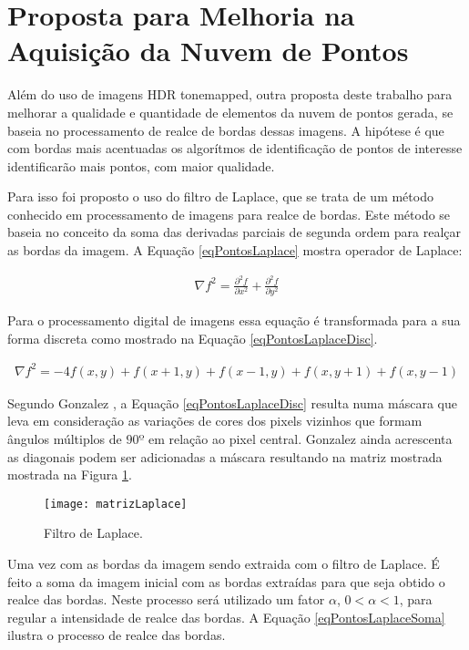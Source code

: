 \section{Proposta para Melhoria na Aquisição da Nuvem de Pontos} \label{pontosProposta}

Além do uso de imagens HDR tonemapped, outra proposta deste trabalho para melhorar a qualidade e quantidade de elementos da nuvem de pontos gerada, se baseia no processamento de realce de bordas dessas imagens. A hipótese é que com bordas mais acentuadas os algorítmos de identificação de pontos de interesse identificarão mais pontos, com maior qualidade.

Para isso foi proposto o uso do filtro de Laplace, que se trata de um método conhecido em processamento de imagens para realce de bordas. Este método se baseia no conceito da soma das derivadas parciais de segunda ordem \cite{gonzalez} para realçar as bordas da imagem. A Equação \ref{eqPontosLaplace} mostra operador de Laplace: \cite{gonzalez}

\begin{align} \label{eqPontosLaplace}
	\nabla f^2 = \frac{\partial^2f}{\partial x^2} + \frac{\partial^2f}{\partial y^2}
\end{align}

Para o processamento digital de imagens essa equação é transformada para a sua forma discreta como mostrado na Equação \ref{eqPontosLaplaceDisc}. \cite{gonzalez}

\begin{align} \label{eqPontosLaplaceDisc}
	\nabla f^2 = -4f(x,y) + f(x+1,y) + f(x-1,y) + f(x,y+1) + f(x,y-1)
\end{align}

Segundo Gonzalez \cite{gonzalez}, a Equação \ref{eqPontosLaplaceDisc} resulta numa máscara que leva em consideração as variações de cores dos pixels vizinhos que formam ângulos múltiplos de $90º$ em relação ao pixel central. Gonzalez \cite{gonzalez} ainda acrescenta as diagonais podem ser adicionadas a máscara resultando na matriz mostrada mostrada na Figura \ref{figPontosLaplaceMat}.

\begin{figure}[H]
  \centering
  \texttt{[image: matrizLaplace]}
  \caption{Filtro de Laplace.}
  \label{figPontosLaplaceMat}
\end{figure}

Uma vez com as bordas da imagem sendo extraida com o filtro de Laplace. É feito a soma da imagem inicial com as bordas extraídas para que seja obtido o realce das bordas. Neste processo será utilizado um fator $\alpha$, $0 < \alpha < 1$, para regular a intensidade de realce das bordas. A Equação \ref{eqPontosLaplaceSoma} ilustra o processo de realce das bordas.

